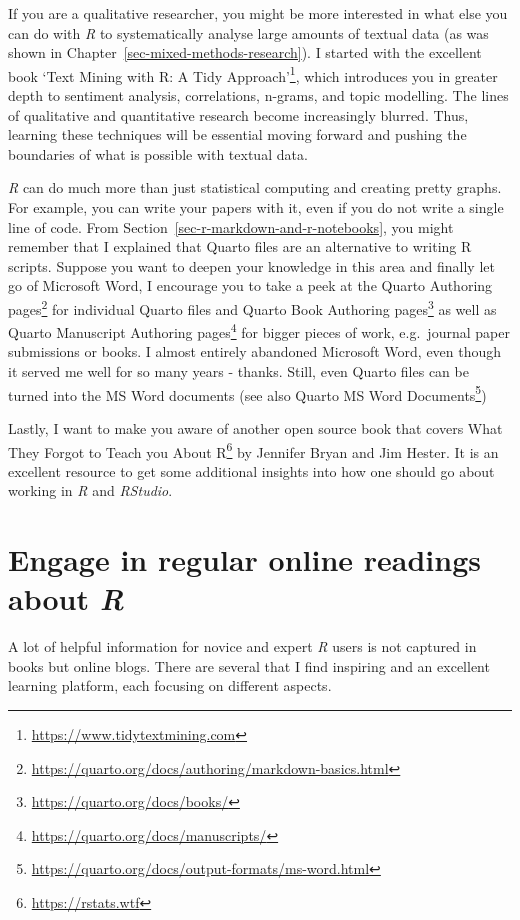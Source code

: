 \documentclass[
  letterpaper,
]{krantz}
\renewcommand{\href}[2]{#2\footnote{\url{#1}}}
\begin{document}
If you are a qualitative researcher, you might be more interested in
what else you can do with \emph{R} to systematically analyse large
amounts of textual data (as was shown in
Chapter~\ref{sec-mixed-methods-research}). I started with the excellent
book \href{https://www.tidytextmining.com}{`Text Mining with R: A Tidy
Approach'}, which introduces you in greater depth to sentiment analysis,
correlations, n-grams, and topic modelling. The lines of qualitative and
quantitative research become increasingly blurred. Thus, learning these
techniques will be essential moving forward and pushing the boundaries
of what is possible with textual data.

\emph{R} can do much more than just statistical computing and creating
pretty graphs. For example, you can write your papers with it, even if
you do not write a single line of code. From
Section~\ref{sec-r-markdown-and-r-notebooks}, you might remember that I
explained that Quarto files are an alternative to writing R scripts.
Suppose you want to deepen your knowledge in this area and finally let
go of Microsoft Word, I encourage you to take a peek at the
\href{https://quarto.org/docs/authoring/markdown-basics.html}{Quarto
Authoring pages} for individual Quarto files and
\href{https://quarto.org/docs/books/}{Quarto Book Authoring pages} as
well as \href{https://quarto.org/docs/manuscripts/}{Quarto Manuscript
Authoring pages} for bigger pieces of work, e.g.~journal paper
submissions or books. I almost entirely abandoned Microsoft Word, even
though it served me well for so many years - thanks. Still, even Quarto
files can be turned into the MS Word documents (see also
\href{https://quarto.org/docs/output-formats/ms-word.html}{Quarto MS
Word Documents})

Lastly, I want to make you aware of another open source book that covers
\href{https://rstats.wtf}{What They Forgot to Teach you About R} by
Jennifer Bryan and Jim Hester. It is an excellent resource to get some
additional insights into how one should go about working in \emph{R} and
\emph{RStudio}.

\section{\texorpdfstring{Engage in regular online readings about
\emph{R}}{Engage in regular online readings about R}}\label{sec-next-steps-online-readings}

A lot of helpful information for novice and expert \emph{R} users is not
captured in books but online blogs. There are several that I find
inspiring and an excellent learning platform, each focusing on different
aspects.
\end{document}
